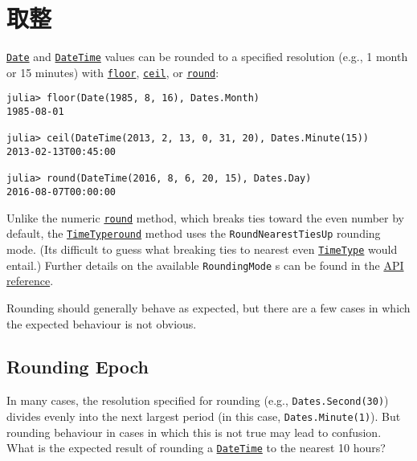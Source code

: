 \hypertarget{2131702258451006422}{}


\section{取整}



\hyperlink{4488183467971164548}{\texttt{Date}} and \hyperlink{17572689933274889838}{\texttt{DateTime}} values can be rounded to a specified resolution (e.g., 1 month or 15 minutes) with \hyperlink{11115257331910840693}{\texttt{floor}}, \hyperlink{10519509038312853061}{\texttt{ceil}}, or \hyperlink{12930779325193350739}{\texttt{round}}:




\begin{verbatim}
julia> floor(Date(1985, 8, 16), Dates.Month)
1985-08-01

julia> ceil(DateTime(2013, 2, 13, 0, 31, 20), Dates.Minute(15))
2013-02-13T00:45:00

julia> round(DateTime(2016, 8, 6, 20, 15), Dates.Day)
2016-08-07T00:00:00
\end{verbatim}



Unlike the numeric \hyperlink{12930779325193350739}{\texttt{round}} method, which breaks ties toward the even number by default, the \hyperlink{4438614350756187528}{\texttt{TimeType}}\hyperlink{12930779325193350739}{\texttt{round}} method uses the \texttt{RoundNearestTiesUp} rounding mode. (It{\textquotesingle}s difficult to guess what breaking ties to nearest {\textquotedbl}even{\textquotedbl} \hyperlink{4438614350756187528}{\texttt{TimeType}} would entail.) Further details on the available \texttt{RoundingMode} s can be found in the \hyperlink{2504340439131318713}{API reference}.



Rounding should generally behave as expected, but there are a few cases in which the expected behaviour is not obvious.



\hypertarget{18235125897086797691}{}


\subsection{Rounding Epoch}



In many cases, the resolution specified for rounding (e.g., \texttt{Dates.Second(30)}) divides evenly into the next largest period (in this case, \texttt{Dates.Minute(1)}). But rounding behaviour in cases in which this is not true may lead to confusion. What is the expected result of rounding a \hyperlink{17572689933274889838}{\texttt{DateTime}} to the nearest 10 hours?




